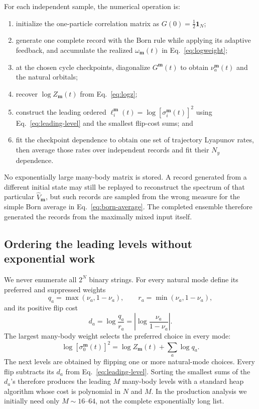 \documentclass[aps,prb,twocolumn,floatfix,nofootinbib,superscriptaddress]{revtex4-2}
\begin{document}
For each independent sample, the numerical operation is:
\begin{enumerate}
 \item initialize the one-particle correlation matrix as \(G(0)=\tfrac12\mathbf{1}_N\);
 \item generate one complete record with the Born rule while applying its adaptive feedback, and accumulate the realized \(\omega_{\boldsymbol m}(t)\) in Eq.~\eqref{eq:logweight};
 \item at the chosen cycle checkpoints, diagonalize \(G^{\boldsymbol m}(t)\) to obtain \(\nu_a^{\boldsymbol m}(t)\) and the natural orbitals;
 \item recover \(\log Z_{\boldsymbol m}(t)\) from Eq.~\eqref{eq:logz};
 \item construct the leading ordered \(\ell_i^{\boldsymbol m}(t)=\log[\sigma_i^{\boldsymbol m}(t)]^2\) using Eq.~\eqref{eq:leading-level} and the smallest flip-cost sums; and
 \item fit the checkpoint dependence to obtain one set of trajectory Lyapunov rates, then average those rates over independent records and fit their \(N_y\) dependence.
\end{enumerate}
No exponentially large many-body matrix is stored.  A record generated from a different initial state may still be replayed to reconstruct the spectrum of that particular \(\hat V_{\boldsymbol m}\), but such records are sampled from the wrong measure for the simple Born average in Eq.~\eqref{eq:born-average}.  The completed ensemble therefore generated the records from the maximally mixed input itself.

\subsection{Ordering the leading levels without exponential work}

We never enumerate all \(2^N\) binary strings.  For every natural mode define its preferred and suppressed weights
\begin{equation}
 q_a=\max(\nu_a,1-\nu_a),
 \qquad
 r_a=\min(\nu_a,1-\nu_a),
 \label{eq:preferred}
\end{equation}
and its positive flip cost
\begin{equation}
 d_a=\log\frac{q_a}{r_a}
 =\left|\log\frac{\nu_a}{1-\nu_a}\right|.
 \label{eq:flip-cost}
\end{equation}
The largest many-body weight selects the preferred choice in every mode:
\begin{equation}
 \log[\sigma_0^{\boldsymbol m}(t)]^2
 =\log Z_{\boldsymbol m}(t)+\sum_a\log q_a.
 \label{eq:leading-level}
\end{equation}
The next levels are obtained by flipping one or more natural-mode choices.  Every flip subtracts its \(d_a\) from Eq.~\eqref{eq:leading-level}.  Sorting the smallest sums of the \(d_a\)'s therefore produces the leading \(M\) many-body levels with a standard heap algorithm whose cost is polynomial in \(N\) and \(M\).  In the production analysis we initially need only \(M\sim16\)--\(64\), not the complete exponentially long list.
\end{document}
